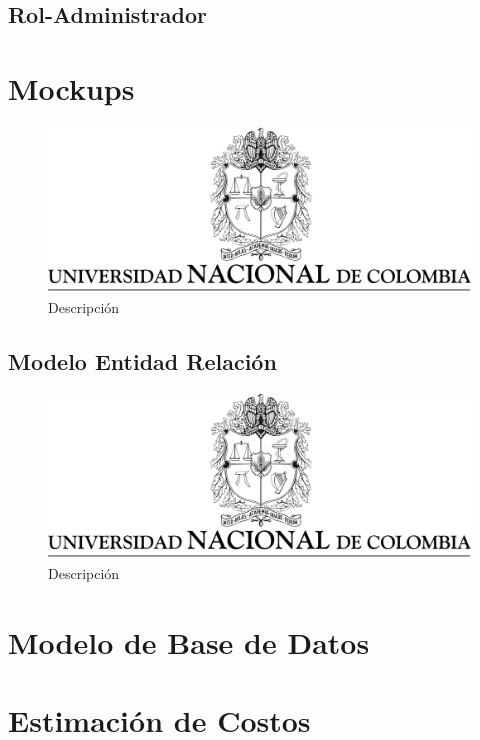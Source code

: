 \documentclass[a4paper,12 pt]{article}
\begin{document}
\subsection{Rol-Administrador}

\section{Mockups}
\begin{figure}[H]
    \centering
    \includegraphics[scale = 0.2]{images/escudoUN.png}
    \caption{Descripción}
    \label{F00}
\end{figure}{}


\begin{landscape}
\section{Modelo Entidad Relación}
    \begin{figure}[H]
        \centering
        \includegraphics[scale = 0.5]{images/escudoUN.png}
        \caption{Descripción}
        \label{F01}
    \end{figure}{}
\end{landscape}


\section{Modelo de Base de Datos}

\section{Estimación de Costos}
\end{document}

